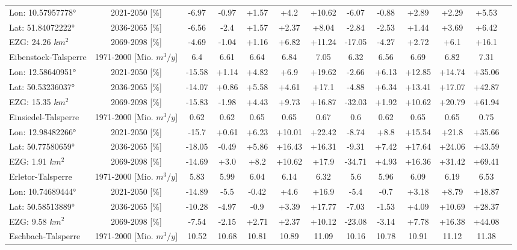 \begin{longtable}{@{\extracolsep{\fill}}lc|ccccc||cccccc}
\cline{2-12} 
Lon: 10.57957778° & 2021-2050 [\%]  & -6.97 & -0.97 & +1.57 & +4.2 & +10.62 & -6.07 & -0.88 & +2.89 & +2.29 & +5.53\\ 
Lat: 51.84072222° & 2036-2065 [\%]  & -6.56 & -2.4 & +1.57 & +2.37 & +8.04 & -2.84 & -2.53 & +1.44 & +3.69 & +6.42\\ 
EZG: 24.26 $km^2$ & 2069-2098 [\%]  & -4.69 & -1.04 & +1.16 & +6.82 & +11.24 & -17.05 & -4.27 & +2.72 & +6.1 & +16.1\\ 
\hline 
Eibenstock-Talsperre & 1971-2000 [Mio. $m^3/y$]  & 6.4 & 6.61 & 6.64 & 6.84 & 7.05 & 6.32 & 6.56 & 6.69 & 6.82 & 7.31\\ 
\cline{2-12} 
Lon: 12.58640951° & 2021-2050 [\%]  & -15.58 & +1.14 & +4.82 & +6.9 & +19.62 & -2.66 & +6.13 & +12.85 & +14.74 & +35.06\\ 
Lat: 50.53236037° & 2036-2065 [\%]  & -14.07 & +0.86 & +5.58 & +4.61 & +17.1 & -4.88 & +6.34 & +13.41 & +17.07 & +42.87\\ 
EZG: 15.35 $km^2$ & 2069-2098 [\%]  & -15.83 & -1.98 & +4.43 & +9.73 & +16.87 & -32.03 & +1.92 & +10.62 & +20.79 & +61.94\\ 
\hline 
Einsiedel-Talsperre & 1971-2000 [Mio. $m^3/y$]  & 0.62 & 0.62 & 0.65 & 0.65 & 0.67 & 0.6 & 0.62 & 0.65 & 0.65 & 0.75\\ 
\cline{2-12} 
Lon: 12.98482266° & 2021-2050 [\%]  & -15.7 & +0.61 & +6.23 & +10.01 & +22.42 & -8.74 & +8.8 & +15.54 & +21.8 & +35.66\\ 
Lat: 50.77580659° & 2036-2065 [\%]  & -18.05 & -0.49 & +5.86 & +16.43 & +16.31 & -9.31 & +7.42 & +17.64 & +24.06 & +43.59\\ 
EZG: 1.91 $km^2$ & 2069-2098 [\%]  & -14.69 & +3.0 & +8.2 & +10.62 & +17.9 & -34.71 & +4.93 & +16.36 & +31.42 & +69.41\\ 
\hline 
Erletor-Talsperre & 1971-2000 [Mio. $m^3/y$]  & 5.83 & 5.99 & 6.04 & 6.14 & 6.32 & 5.6 & 5.96 & 6.09 & 6.19 & 6.53\\ 
\cline{2-12} 
Lon: 10.74689444° & 2021-2050 [\%]  & -14.89 & -5.5 & -0.42 & +4.6 & +16.9 & -5.4 & -0.7 & +3.18 & +8.79 & +18.87\\ 
Lat: 50.58513889° & 2036-2065 [\%]  & -10.28 & -4.97 & -0.9 & +3.39 & +17.77 & -7.03 & -1.53 & +4.09 & +10.69 & +28.37\\ 
EZG: 9.58 $km^2$ & 2069-2098 [\%]  & -7.54 & -2.15 & +2.71 & +2.37 & +10.12 & -23.08 & -3.14 & +7.78 & +16.38 & +44.08\\ 
\hline 
Eschbach-Talsperre & 1971-2000 [Mio. $m^3/y$]  & 10.52 & 10.68 & 10.81 & 10.89 & 11.09 & 10.16 & 10.78 & 10.91 & 11.12 & 11.38\\ 

\end{longtable}
